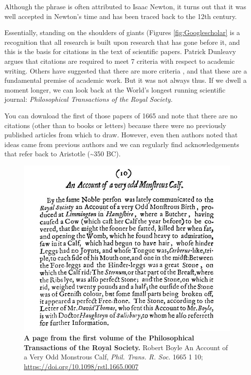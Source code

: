 \documentclass[
]{krantz}
\begin{document}
Although the phrase is often attributed to Isaac Newton, it turns out that it was well accepted in Newton's time and has been traced back to the 12th century.

Essentially, standing on the shoulders of giants (Figures \ref{fig:Googlescholar} is a recognition that all research is built upon research that has gone before it, and this is the basis for citations in the text of scientific papers. Patrick Dunleavy \citep{dunleavy2017citations} argues that citations are required to meet 7 criteria with respect to academic writing. Others have suggested that there are more criteria \citep[see][]{harwood2009interview}, and that these are a fundamental premise of academic work. But it was not always thus. If we dwell a moment longer, we can look back at the World's longest running scientific journal: \emph{Philosophical Transactions of the Royal Society.}

You can download the first of those papers of 1665 and note that there are no citations (other than to books or letters) because there were no previously published articles from which to draw. However, even then authors noted that ideas came from previous authors and we can regularly find acknowledgements that refer back to Aristotle (\textasciitilde350 BC).



\begin{figure}
\includegraphics[width=0.9\linewidth]{figures/Boyle} \caption{\textbf{A page from the first volume of the Philosophical Transactions of the Royal Society.} Robert Boyle An Account of a Very Odd Monstrous Calf, \emph{Phil. Trans. R. Soc.} 1665 1 10; \url{https://doi.org/10.1098/rstl.1665.0007}}\label{fig:Boyle}
\end{figure}
\end{document}
